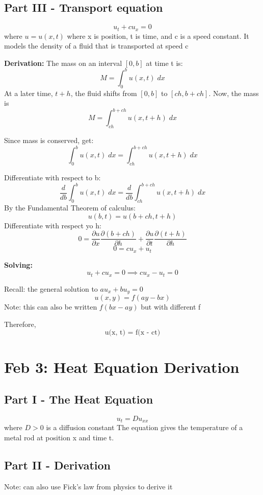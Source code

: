 \documentclass[12pt]{article}
\newcommand{\ans}[1]{\boxed{\text{#1}}}
\begin{document}
\subsection*{Part III - Transport equation}
\[u_t + cu_x = 0\]
where $u = u(x, t)$ where x is position, t is time, and c is a speed constant. 
It models the density of a fluid that is transported at speed c  

\textbf{Derivation:}
The mass on an interval $[0, b]$ at time t is:
\[M = \int_0^b u(x, t) \; dx\]
At a later time, $t + h$, the fluid shifts from $[0, b]$ to $[ch, b + ch]$. Now, the mass is 
\[M = \int_{ch}^{b+ch} u(x, t + h)\; dx\]

Since mass is conserved, get:
\[\int_0^b u(x, t) \; dx = \int_{ch}^{b+ch} u(x, t + h)\; dx\]

Differentiate with respect to b:
\[\frac{d}{db} \int_0^b u(x, t) \; dx = \frac{d}{db} \int_{ch}^{b+ch} u(x, t + h)\; dx\]
By the Fundamental Theorem of calculus:
\[u(b, t) = u(b+ch, t + h)\]
Differentiate with respect yo h:
\[0 = \frac{\partial u}{\partial x} \frac{\partial (b + ch)}{\partial h} + \frac{\partial u}{\partial t} \frac{\partial (t+h)}{\partial h}\]
\[0 = cu_x + u_t\]

\textbf{Solving:}
\[u_t + cu_x = 0 \implies cu_x - u_t = 0\]

Recall: the general solution to $au_x + bu_y = 0$
\[u(x, y) = f(ay - bx)\]
Note: this can also be written $f(bx - ay)$ but with different f 

Therefore, 
\[\ans{u(x, t) = f(x - ct)}\]

\section{Feb 3: Heat Equation Derivation}
\subsection*{Part I - The Heat Equation}
\[u_t = Du_{xx}\]
where $D > 0$ is a diffusion constant
The equation gives the temperature of a metal rod at position x and time t.

\subsection*{Part II - Derivation}
Note: can also use Fick's law from physics to derive it
\end{document}
